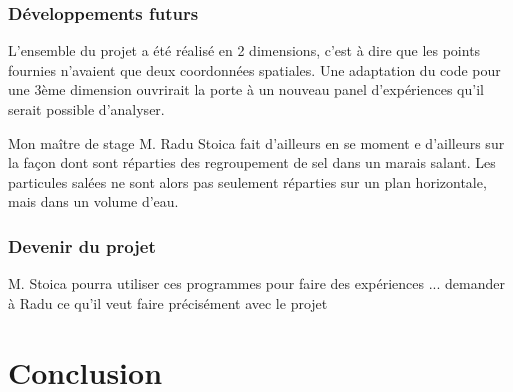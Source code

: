\documentclass[stage2a]{tnreport}
\begin{document}
\subsection{Développements futurs}
L'ensemble du projet a été réalisé en 2 dimensions, c'est à dire que les points fournies n'avaient que deux coordonnées spatiales. Une adaptation du code pour une 3ème dimension ouvrirait la porte à un nouveau panel d'expériences qu'il serait possible d'analyser.

Mon maître de stage M. Radu Stoica fait d'ailleurs en se moment e  d'ailleurs sur la façon dont sont réparties des regroupement de sel dans un marais salant. Les particules salées ne sont alors pas seulement réparties sur un plan horizontale, mais dans un volume d'eau.


\subsection{Devenir du projet}
M. Stoica pourra utiliser ces programmes pour faire des expériences ... demander à Radu ce qu'il veut faire précisément avec le projet


\chapter{Conclusion}







\newpage
~
\newpage



\renewcommand{\tocbibname}{Bibliographie / Webographie}

\end{document}
